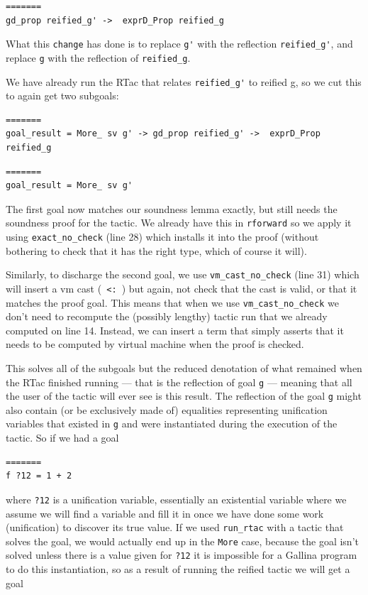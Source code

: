 \documentclass{puthesis}
\begin{document}
\begin{lstlisting}
=======
gd_prop reified_g' ->  exprD_Prop reified_g
\end{lstlisting}

What this \lstinline|change| has done is to replace \lstinline|g'| with the
reflection \lstinline|reified_g'|, and replace \lstinline|g| with the
reflection of \lstinline|reified_g|.

We have already run the RTac that relates \lstinline|reified_g'| to
reified g, so we cut this to again get two subgoals:

\begin{lstlisting}
=======
goal_result = More_ sv g' -> gd_prop reified_g' ->  exprD_Prop reified_g
\end{lstlisting}

\begin{lstlisting}
=======
goal_result = More_ sv g'
\end{lstlisting}

The first goal now matches our soundness lemma exactly, but still
needs the soundness proof for the tactic. We already have this in
\lstinline|rforward| so we apply it using \lstinline|exact_no_check|
(line 28) which installs it into the proof (without bothering to check
that it has the right type, which of course it will).

Similarly, to discharge the second goal, we use 
\lstinline|vm_cast_no_check| (line 31) which will insert a vm cast (\lstinline| <: |)
but again, not check that the cast is valid, or that it matches the proof
goal. This means that when we use \lstinline|vm_cast_no_check| we
don't need to recompute the (possibly lengthy) tactic run that we
already computed on line 14. Instead, we can insert a term that simply
asserts that it needs to be computed by virtual machine when the proof
is checked.

This solves all of the subgoals but the reduced denotation of what
remained when the RTac finished running --- that is the reflection of
goal \lstinline|g| --- meaning that all the user
of the tactic will ever see is this result. The reflection of the goal
\lstinline|g| might also contain (or be exclusively made of)
equalities representing unification variables that existed in
\lstinline|g| and were instantiated during the execution of the
tactic. So if we had a goal

\begin{lstlisting}
=======
f ?12 = 1 + 2
\end{lstlisting}
where \lstinline|?12| is a unification variable, essentially an
existential variable where we assume we will find a variable and fill
it in once we have done some work (unification) to discover its true
value. If we used \lstinline|run_rtac| with a tactic that solves the goal, we
would actually end up in the \lstinline|More| case, because the goal
isn't solved unless there is a value given for \lstinline|?12| it is
impossible for a Gallina program to do this instantiation, so as a
result of running the reified tactic we will get a goal
\end{document}
